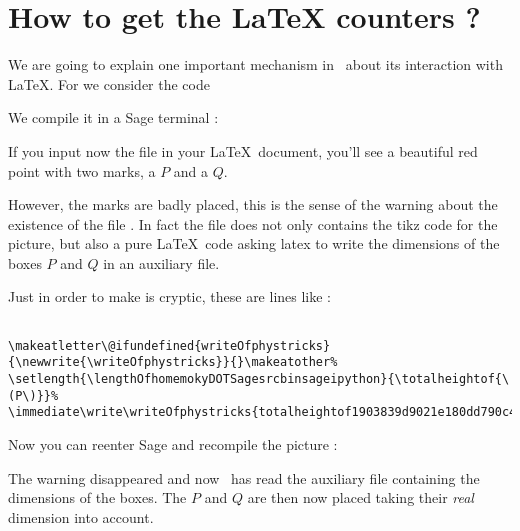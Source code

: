 \section{How to get the LaTeX counters ?}
\label{SECooKVXMooMKJAXV}

We are going to explain one important mechanism in \phystricks\ about its interaction with \LaTeX. For we consider the code



We compile it in a Sage terminal :



If you input now the file  in your \LaTeX\ document, you'll see a beautiful red point with two marks, a \( P\) and a \( Q\).  

\begin{center}
   
\end{center}

However, the marks are badly placed, this is the sense of the warning about the existence of the file . In fact the file  does not only contains the tikz code for the picture, but also a pure \LaTeX\ code asking latex to write the dimensions of the boxes \( P\) and \( Q\) in an auxiliary file.

Just in order to make is cryptic, these are lines like :
\begin{verbatim}

\makeatletter\@ifundefined{writeOfphystricks}{\newwrite{\writeOfphystricks}}{}\makeatother%
\setlength{\lengthOfhomemokyDOTSagesrcbinsageipython}{\totalheightof{\(P\)}}%
\immediate\write\writeOfphystricks{totalheightof1903839d9021e180dd790c4cc63081c63b2fe6f1:\the\lengthOfhomemokyDOTSagesrcbinsageipython-}
\end{verbatim}

Now you can reenter Sage and recompile the picture :



The warning disappeared and now \phystricks\ has read the auxiliary file containing the dimensions of the boxes. The \( P\) and \( Q\) are then now placed taking their \emph{real} dimension into account.

